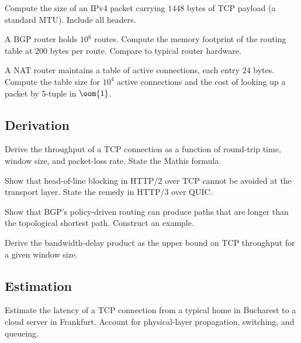 \begin{exercise}
Compute the size of an IPv4 packet carrying $1448$ bytes of TCP payload (a standard MTU). Include all headers.
\end{exercise}

\begin{exercise}
A BGP router holds $10^6$ routes. Compute the memory footprint of the routing table at $200$ bytes per route. Compare to typical router hardware.
\end{exercise}

\begin{exercise}
A NAT router maintains a table of active connections, each entry $24$ bytes. Compute the table size for $10^4$ active connections and the cost of looking up a packet by 5-tuple in $\oom{1}$.
\end{exercise}

\subsection*{Derivation}

\begin{exercise}
Derive the throughput of a TCP connection as a function of round-trip time, window size, and packet-loss rate. State the Mathis formula.
\end{exercise}

\begin{exercise}
Show that head-of-line blocking in HTTP/2 over TCP cannot be avoided at the transport layer. State the remedy in HTTP/3 over QUIC.
\end{exercise}

\begin{exercise}
Show that BGP's policy-driven routing can produce paths that are longer than the topological shortest path. Construct an example.
\end{exercise}

\begin{exercise}
Derive the bandwidth-delay product as the upper bound on TCP throughput for a given window size.
\end{exercise}

\subsection*{Estimation}

\begin{exercise}
Estimate the latency of a TCP connection from a typical home in Bucharest to a cloud server in Frankfurt. Account for physical-layer propagation, switching, and queueing.
\end{exercise}


